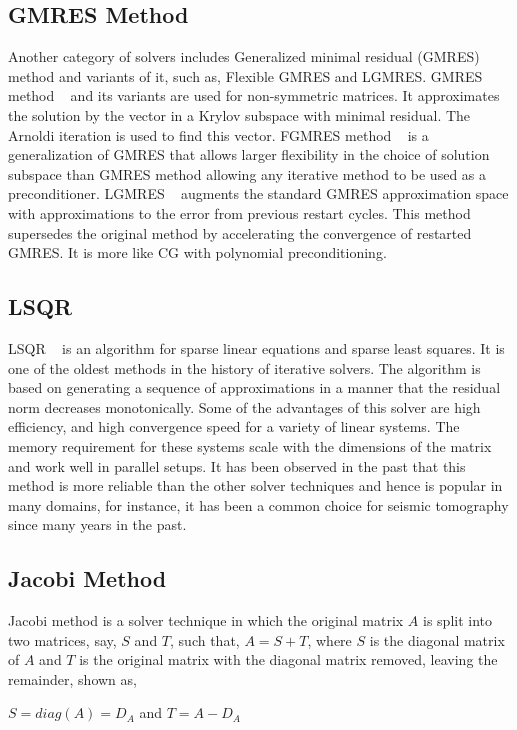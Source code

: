 \subsection{GMRES Method}
Another category of solvers includes Generalized minimal residual (GMRES) method and variants of it, such as, Flexible GMRES and LGMRES. GMRES method ~\cite{gmres1, gmres2} and its variants are used for non-symmetric matrices. It approximates the solution by the vector in a Krylov subspace with minimal residual. The Arnoldi iteration is used to find this vector. FGMRES method ~\cite{fgmres1,fgmres2} is a generalization of GMRES that allows larger flexibility in the choice of solution subspace
than GMRES method allowing any iterative method to be used as a preconditioner. LGMRES ~\cite{lgmres,lgmres2} augments the standard GMRES approximation space with approximations
to the error from previous restart cycles. This method supersedes the original method by accelerating the convergence of restarted GMRES. It is more like CG with polynomial preconditioning.

\subsection{LSQR}
LSQR ~\cite{lsqr1,lsqr2} is an algorithm for sparse linear equations and sparse least squares. It is one of the oldest methods in the history of iterative solvers. The algorithm is based on generating a sequence of approximations in a manner that the residual norm decreases monotonically. Some of the advantages of this solver are high efficiency, and high convergence speed for a variety of linear systems. The memory requirement for these systems scale with the dimensions of the matrix and work well in parallel setups. It has been observed in the past that this method is more reliable than the other solver techniques and hence is popular in many domains, for instance, it has been a common choice for seismic tomography since many years in the past. 

\subsection{ Jacobi Method}
Jacobi method is a solver technique in which the original matrix $A$ is split into two matrices, say, $S$ and $T$, such that, $A = S + T$, where $S$ is the diagonal matrix of $A$ and $T$ is the original matrix with the diagonal matrix removed, leaving the remainder, shown as, 
\begin{center}
$S = diag(A) = D_{A}$ and $T = A - D_{A}$
\end{center}

